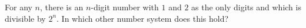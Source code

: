 For any $n$, there is an $n$-digit number with $1$ and $2$ as the only digits and which is divisible by $2^n$. In which other number system does this hold?
